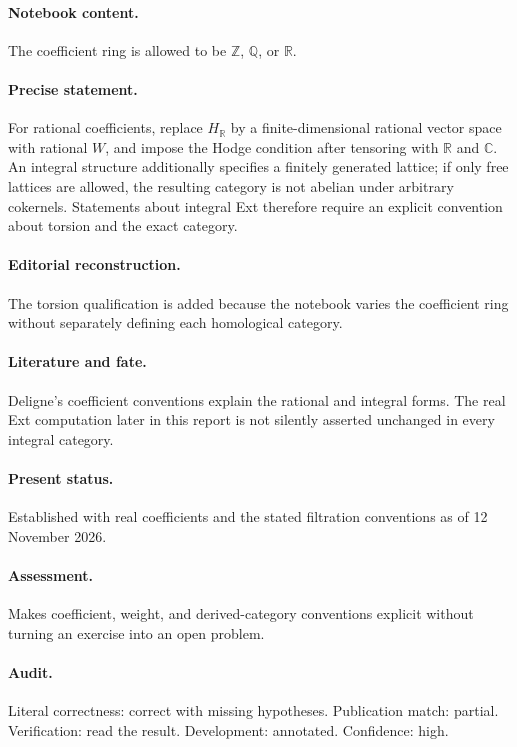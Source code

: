 \paragraph{Notebook content.} The coefficient ring is allowed to be \(\mathbb Z\), \(\mathbb Q\), or \(\mathbb R\).

\paragraph{Precise statement.} For rational coefficients, replace \(H_{\mathbb R}\) by a finite-dimensional rational vector space with rational \(W\), and impose the Hodge condition after tensoring with \(\mathbb R\) and \(\mathbb C\). An integral structure additionally specifies a finitely generated lattice; if only free lattices are allowed, the resulting category is not abelian under arbitrary cokernels. Statements about integral Ext therefore require an explicit convention about torsion and the exact category.

\paragraph{Editorial reconstruction.} The torsion qualification is added because the notebook varies the coefficient ring without separately defining each homological category.

\paragraph{Literature and fate.} Deligne’s coefficient conventions explain the rational and integral forms. The real Ext computation later in this report is not silently asserted unchanged in every integral category.

\paragraph{Present status.} Established with real coefficients and the stated filtration conventions as of 12 November 2026.

\paragraph{Assessment.} Makes coefficient, weight, and derived-category conventions explicit without turning an exercise into an open problem.

\paragraph{Audit.} Literal correctness: correct with missing hypotheses. Publication match: partial. Verification: read the result. Development: annotated. Confidence: high.

